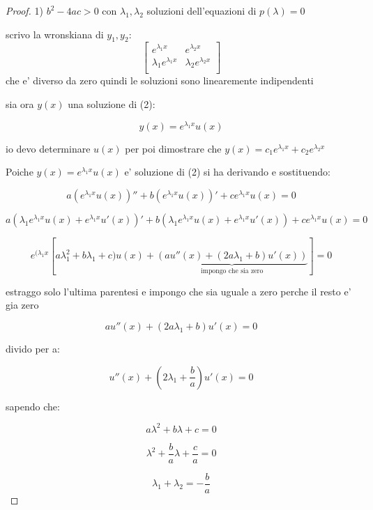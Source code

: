\documentclass[11pt]{article}
\begin{document}
\begin{proof}
       1) $b^{2}-4ac >0$ con $\lambda_1,\lambda_2$ soluzioni dell'equazioni di $p(\lambda)=0$    

       scrivo la wronskiana di $y_1,y_2$:
       \[
        \begin{bmatrix}
            
        e ^{\lambda_1 x} & e ^{\lambda_2 x} \\
        \lambda_1e ^{\lambda_1 x} & \lambda_2e ^{\lambda_2 x} \\
        
        \end{bmatrix}
       \]
        che e' diverso da zero quindi le soluzioni sono linearemente indipendenti

        sia ora $y(x)$ una soluzione di (2):

        \[
            y(x) = e ^{\lambda_1 x}u(x)
        \]

        io devo determinare $u(x)$ per poi dimostrare che $y(x) = c_1e ^{\lambda_1 x}+c_2 e^{\lambda_2 x}$

        Poiche $y(x) = e ^{\lambda_1 x}u(x)$ e' soluzione di (2) si ha derivando e sostituendo:

        \[
            a( e ^{\lambda_1 x} u(x))'' + b(e ^{\lambda_1 x}u(x))'+ c e ^{\lambda_1 x}u(x) =0
        \]

        \[
            a(\lambda_1 e ^{\lambda_1 x} u(x)+ e ^{\lambda_1 x}u'(x))' + b(\lambda_1e ^{\lambda_1 x}u(x) + e ^{\lambda_1 x}u'(x))+ c e ^{\lambda_1 x}u(x) =0
        \]

        \[
            e ^{(\lambda_1 x}[a \lambda_1 ^{2} + b \lambda_1+c)u(x)+\underbrace{(au''(x)+(2a \lambda_1 + b)u'(x))}_\text{impongo che sia zero}]=0
        \]

        estraggo solo l'ultima parentesi e impongo che sia uguale a zero perche il resto e' gia zero

        \[
            au''(x) + (2a \lambda_1 + b) u'(x) = 0
        \]

        divido per a:

        \[
            u''(x) +(2 \lambda_1 + \frac{b}{a}) u'(x) = 0
        \]

        sapendo che:

        \[
            a \lambda^{2} + b \lambda + c =0
        \]

        \[
             \lambda^{2} + \frac{b}{a} \lambda + \frac{c}{a} =0
        \]

        \[
            \lambda_1 + \lambda_2 = -\frac{b}{a}
        \]


\end{proof}
\end{document}
